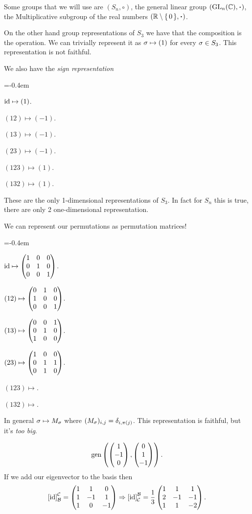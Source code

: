 \documentclass[12pt]{memoir}
\begin{document}
\begin{Ex}
    Some groups that we will use are $(S_n,\circ)$, the general linear group $(\GL_n(\bC),\.)$, the Multiplicative subgroup of the real numbers $(\bR\less\set{0},\.)$.\par 
    On the other hand group representations of $S_3$ we have that the composition is the operation. We can trivially represent it as $\sigma\mapsto (1)$ for every $\sigma\in S_3$. This representation is not faithful.\par 
    We also have the \emph{sign representation} 
    \begin{itemize}\begin{multicols}{3}
        \itemsep=-0.4em
\item $\operatorname{id}\mapsto (1)$.     
\item $(12)\mapsto (-1)$.       
\item $(13)\mapsto (-1)$.       
\item $(23)\mapsto (-1)$.       
\item $(123)\mapsto (1)$.       
\item $(132)\mapsto (1)$.        
    \end{multicols}
    \end{itemize}
    These are the only 1-dimensional representations of $S_3$. In fact for $S_n$ this is true, there are only 2 one-dimensional representation.\par 
    We can represent our permutations as permutation matrices!
    \begin{itemize}\begin{multicols}{3}
        \itemsep=-0.4em
\item $\operatorname{id}\mapsto \begin{pmatrix} 1 & 0 & 0 \\ 0 & 1 & 0 \\ 0 & 0 & 1 \end{pmatrix}$.     
\item $(12)\mapsto \begin{pmatrix} 0 & 1 & 0 \\ 1 & 0 & 0 \\ 0 & 0 & 1 \end{pmatrix}$.       
\item $(13)\mapsto \begin{pmatrix} 0 & 0 & 1 \\ 0 & 1 & 0 \\ 1 & 0 & 0 \end{pmatrix}$.       
\item $(23)\mapsto \begin{pmatrix} 1 & 0 & 0 \\ 0 & 1 & 1 \\ 0 & 1 & 0 \end{pmatrix}$.        
\item $(123)\mapsto $.       
\item $(132)\mapsto $.        
    \end{multicols}
    \end{itemize}
    In general $\sigma\mapsto M_\sigma$ where $(M_\sigma)_{i,j}=\delta_{i,\pi(j)}$. This representation is faithful, but it's \emph{too big}.
\end{Ex}

$$\operatorname{gen}\left(\begin{pmatrix} 1 \\ -1 \\ 0 \end{pmatrix},\begin{pmatrix} 0 \\ 1 \\ -1 \end{pmatrix}\right).$$
If we add our eigenvector to the basis then 
$$\left\lbrack\operatorname{id}\right\rbrack_{\mathcal{B}}^{\mathcal{C}}=\begin{pmatrix} 1 & 1 & 0 \\ 1 & -1 & 1 \\ 1 & 0 & -1 \end{pmatrix}\Rightarrow\left\lbrack\operatorname{id}\right\rbrack^{\mathcal{B}}_{\mathcal{C}}=\frac{1}{3}\begin{pmatrix} 1 & 1 & 1 \\ 2 & -1 & -1 \\ 1 & 1 & -2 \end{pmatrix}.$$
\end{document}
